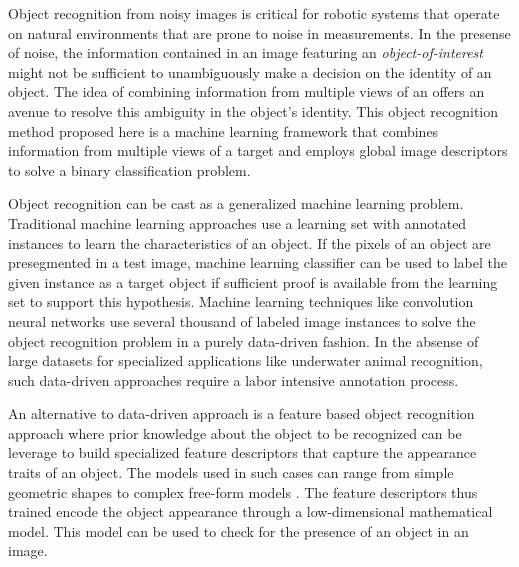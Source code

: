 \documentclass {udthesis}
\begin{document}
Object recognition from noisy images is critical for robotic systems that operate on natural environments that are prone to noise in measurements. In the presense of noise, the information contained in an image featuring an \emph{object-of-interest} might not be sufficient to unambiguously make a decision on the identity of an object. The idea of combining information from multiple views of an offers an avenue to resolve this ambiguity in the object's identity. This object recognition method proposed here is a machine learning framework that combines information from multiple views of a target and employs global image descriptors to solve a binary classification problem.

Object recognition can be cast as a generalized machine learning problem. Traditional machine learning approaches \cite{alpaydin} use a learning set with annotated instances to learn the characteristics of an object. If the pixels of an object are presegmented in a test image, machine learning classifier can be used to label the given instance as a target object if sufficient proof is available from the learning set to support this hypothesis. Machine learning techniques like convolution neural networks \cite{cnn} use several thousand of labeled image instances to solve the object recognition problem in a purely data-driven fashion. In the absense of large datasets for specialized applications like underwater animal recognition, such data-driven approaches require a labor intensive annotation process.

An alternative to data-driven approach is a feature based object recognition approach \cite{roth} where prior knowledge about the object to be recognized can be leverage to build specialized feature descriptors that capture the appearance traits of an object. The models used in such cases can range from simple geometric shapes to complex free-form models \cite{campbell, belongie}. The feature descriptors thus trained encode the object appearance through a low-dimensional mathematical model. This model can be used to check for the presence of an object in an image.
\end{document}
